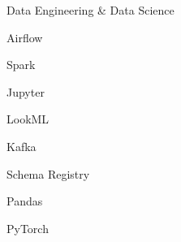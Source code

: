 \begin{skillset}{Data Engineering \& Data Science}
  \item Airflow
  \item Spark
  \item Jupyter
  \item LookML
  \item Kafka
  \item Schema Registry
  \item Pandas
  \item PyTorch
\end{skillset}
